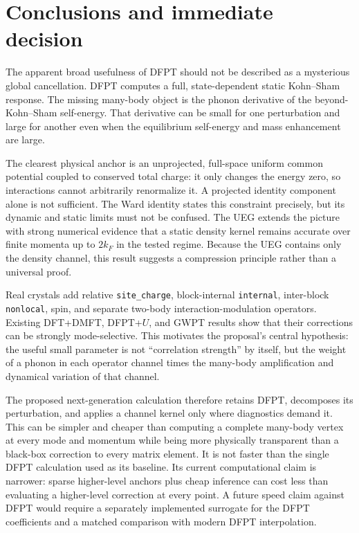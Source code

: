 \section{Conclusions and immediate decision}
\label{sec:conclusions}

The apparent broad usefulness of DFPT should not be described as a mysterious
global cancellation.  DFPT computes a full, state-dependent static Kohn--Sham
response.  The missing many-body object is the phonon derivative of the
beyond-Kohn--Sham self-energy.  That derivative can be small for one perturbation
and large for another even when the equilibrium self-energy and mass enhancement
are large.

The clearest physical anchor is an unprojected, full-space uniform common
potential coupled to conserved total charge: it only changes the energy zero, so
interactions cannot arbitrarily renormalize it.  A projected identity component
alone is not sufficient.  The Ward identity states this constraint precisely, but its
dynamic and static limits must not be confused.  The UEG extends the picture with
strong numerical evidence that a static density kernel remains accurate over
finite momenta up to $2k_F$ in the tested regime.  Because the UEG contains only
the density channel, this result suggests a compression principle rather than a
universal proof.

Real crystals add relative \texttt{site\_charge}, block-internal
\texttt{internal}, inter-block \texttt{nonlocal}, spin, and separate two-body
interaction-modulation operators.  Existing DFT+DMFT, DFPT+$U$, and GWPT results
show that their corrections can be strongly mode-selective.  This motivates the
proposal's central hypothesis: the useful small parameter is not ``correlation
strength'' by itself, but the weight of a phonon in each operator channel times
the many-body amplification and dynamical variation of that channel.

The proposed next-generation calculation therefore retains DFPT, decomposes its
perturbation, and applies a channel kernel only where diagnostics demand it.  This
can be simpler and cheaper than computing a complete many-body vertex at every
mode and momentum while being more physically transparent than a black-box
correction to every matrix element.  It is not faster than the single DFPT
calculation used as its baseline.  Its current computational claim is narrower:
sparse higher-level anchors plus cheap inference can cost less than evaluating a
higher-level correction at every point.  A future speed claim against DFPT would
require a separately implemented surrogate for the DFPT coefficients and a
matched comparison with modern DFPT interpolation.


